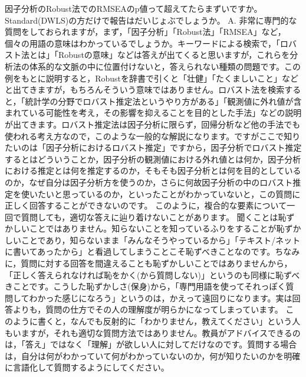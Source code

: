 \documentclass{ltjsbook}
\begin{document}
\begin{FAQ}{因子分析のRobust法でのRMSEAのp値って超えてたらまずいですか。Standard(DWLS)の方だけで報告はだいじょぶでしょうか。}{}
	\tcblower
	{\large A.} 非常に専門的な質問をしておられますが，まず，「因子分析」「Robust法」「RMSEA」など，個々の用語の意味はわかっているでしょうか。キーワードによる検索で，「ロバスト法とは」「Robustの意味」などは答えが出てくると思いますが，これらを分析法の体系的な文脈の中に位置付けないと，答えられない種類の問題です。この例をもとに説明すると，Robustを辞書で引くと「壮健」「たくましいこと」などと出てきますが，もちろんそういう意味ではありません。ロバスト法を検索すると，「統計学の分野でロバスト推定法というやり方がある」「観測値に外れ値が含まれている可能性を考え，その影響を抑えることを目的とした手法」などの説明が出てきます。ロバスト推定法は因子分析に限らず，回帰分析など他の手法でも使われる考え方なので，このような一般的な解説になります。ですがここで知りたいのは「因子分析におけるロバスト推定」ですから，因子分析でロバスト推定するとはどういうことか，因子分析の観測値における外れ値とは何か，因子分析における推定とは何を推定するのか，そもそも因子分析とは何を目的としているのか，なぜ自分は因子分析方を使うのか，さらに何故因子分析の中のロバスト推定を使いたいと思っているのか，といったことがわかっていないと，この質問に正しく回答することができないのです。
	このように，複合的な要素について一回で質問しても，適切な答えに辿り着けないことがあります。
	聞くことは恥ずかしいことではありません。知らないことを知っているふりをすることが恥ずかしいことであり，知らないまま「みんなそうやっているから」「テキスト/ネットに書いてあったから」と看過してしまうことこそ恥ずべきことなのです。ちなみに，質問に対する回答を間違えることも恥ずかしいことではありませんから，「正しく答えられなければ恥をかく(から質問しない)」というのも同様に恥ずべきことです。こうした恥ずかしさ(保身)から，「専門用語を使ってそれっぽく質問してわかった感じになろう」というのは，かえって遠回りになります。実は回答よりも，質問の仕方でその人の理解度が明らかになってしまっています。
	このように書くと，なんでも反射的に「わかりません，教えてください」という人もいますが，それも適切な質問方法ではありません。教員がアドバイスできるのは，「答え」ではなく「理解」が欲しい人に対してだけなのです。質問する場合は，自分は何がわかっていて何がわかっていないのか，何が知りたいのかを明確に言語化して質問するようにしてください。
\end{FAQ}
\end{document}
